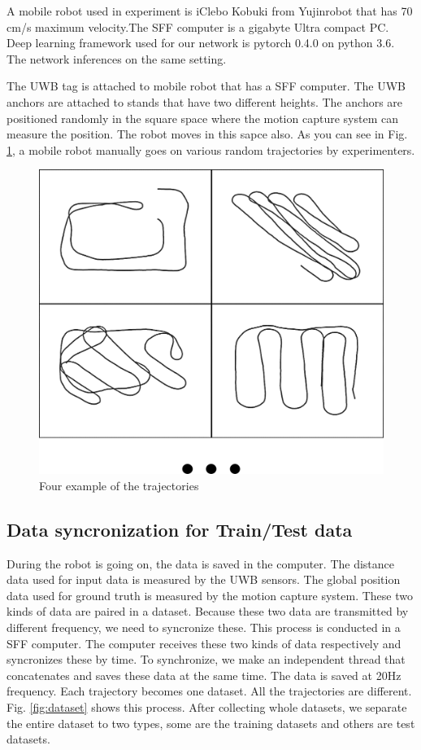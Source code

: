 \documentclass{ieeeaccess}
\begin{document}
A mobile robot used in experiment is iClebo Kobuki from Yujinrobot that has 70 cm/s maximum velocity.The SFF computer is a gigabyte Ultra compact PC. Deep learning framework used for our network is pytorch 0.4.0 on python 3.6. The network inferences on the same setting.

The UWB tag is attached to mobile robot that has a SFF computer. The UWB anchors are attached to stands that have two different heights. The anchors are positioned randomly in the square space where the motion capture system can measure the position. The robot moves in this sapce also. As you can see in Fig. \ref{fig:paths}, a mobile robot manually goes on various random trajectories by experimenters.

\begin{figure}[h!]
	\centering
	\includegraphics[width=0.9\linewidth]{paths}
	\caption{Four example of the trajectories}
	\label{fig:paths} 
\end{figure}

\subsection{Data syncronization for Train/Test data}
During the robot is going on, the data is saved in the computer. The distance data used for input data is measured by the UWB sensors. The global position data used for ground truth is measured by the motion capture system. These two kinds of data are paired in a dataset. Because these two data are transmitted by different frequency, we need to syncronize these. This process is conducted in a SFF computer. The computer receives these two kinds of data respectively and syncronizes these by time. To synchronize, we make an independent thread that concatenates and saves these data at the same time. The data is saved at 20Hz frequency. Each trajectory becomes one dataset. All the trajectories are different. Fig. \ref{fig:dataset} shows this process. After collecting whole datasets, we separate the entire dataset to two types, some are the training datasets and others are test datasets.
\end{document}
